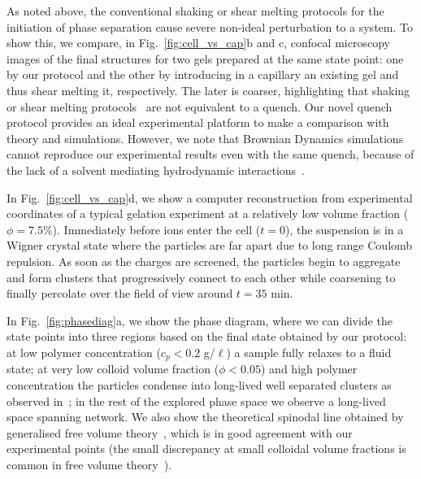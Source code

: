 \documentclass[preprint,footinbib,amsmath,amssymb,superscriptaddress]{revtex4}
\begin{document}
As noted above, the conventional shaking or shear melting protocols for the initiation of phase separation cause severe non-ideal perturbation to a system. To show this,  
we compare, in Fig.~\ref{fig:cell_vs_cap}b and c, confocal microscopy images of the final structures for two gels prepared at the same state point: one by our protocol and the other by introducing in a capillary an existing gel and thus shear melting it, respectively. The later is coarser, highlighting that shaking or shear melting protocols~\cite{lu2008gelation,Teece2011,Bartlett2012} are not equivalent to a quench. 
Our novel quench protocol provides an ideal experimental platform to make a comparison with theory and simulations. However, we note that Brownian Dynamics simulations cannot reproduce our experimental results even with the same quench, because of the lack of a solvent mediating hydrodynamic interactions~\cite{tanaka2000simulation,Furukawa2010}. 

In Fig.~\ref{fig:cell_vs_cap}d, we show a computer reconstruction from experimental coordinates of a typical gelation experiment at a relatively low volume fraction ($\phi=7.5\%$). Immediately before ions enter the cell ($t=0$), the suspension is in a Wigner crystal state where the particles are far apart due to long range Coulomb repulsion. As soon as the charges are screened, the particles begin to aggregate and form clusters that progressively connect to each other while coarsening to finally percolate over the field of view around $t=35$ min.


In Fig.~\ref{fig:phasediag}a, we show the phase diagram, where we can divide the state points into three regions based on the final state obtained by our protocol: at low polymer concentration ($c_p<0.2$ g/$\ell$) a sample fully relaxes to a fluid state; at very low colloid volume fraction ($\phi<0.05$) and high polymer concentration the particles condense into long-lived well separated clusters as observed in~\cite{Lu2006}; in the rest of the explored phase space we observe a long-lived space spanning network. 
We also show the theoretical spinodal line obtained by generalised free volume theory~\cite{Fleer2008}, which is in good agreement with our experimental points 
(the small discrepancy at small colloidal volume fractions is common in free volume theory~\cite{Shah2003,Bergenholtz2003,lu2008gelation}). 
\end{document}
